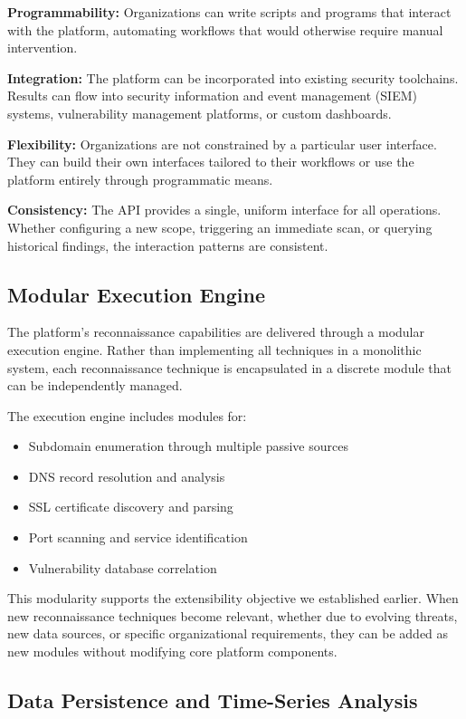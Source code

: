 \documentclass[a4paper,12pt]{report}
\begin{document}
\textbf{Programmability:} Organizations can write scripts and programs that interact with the platform, automating workflows that would otherwise require manual intervention.\hfill \break

\textbf{Integration:} The platform can be incorporated into existing security toolchains. Results can flow into security information and event management (SIEM) systems, vulnerability management platforms, or custom dashboards.\hfill \break

\textbf{Flexibility:} Organizations are not constrained by a particular user interface. They can build their own interfaces tailored to their workflows or use the platform entirely through programmatic means.\hfill \break

\textbf{Consistency:} The API provides a single, uniform interface for all operations. Whether configuring a new scope, triggering an immediate scan, or querying historical findings, the interaction patterns are consistent.\hfill \break

\subsection{Modular Execution Engine}

The platform's reconnaissance capabilities are delivered through a modular execution engine. Rather than implementing all techniques in a monolithic system, each reconnaissance technique is encapsulated in a discrete module that can be independently managed.\hfill \break

The execution engine includes modules for:
\begin{itemize}
\item Subdomain enumeration through multiple passive sources
\item DNS record resolution and analysis
\item SSL certificate discovery and parsing
\item Port scanning and service identification
\item Vulnerability database correlation
\end{itemize}

This modularity supports the extensibility objective we established earlier. When new reconnaissance techniques become relevant, whether due to evolving threats, new data sources, or specific organizational requirements, they can be added as new modules without modifying core platform components.\hfill \break

\subsection{Data Persistence and Time-Series Analysis}
\end{document}
